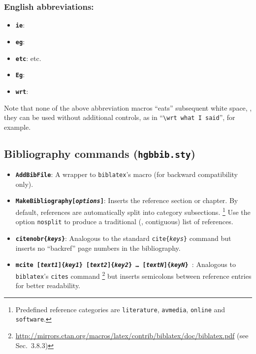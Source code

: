 \documentclass[english]{hgbarticle}
\begin{document}
\subsubsection*{English abbreviations:}

\begin{itemize}
    \item \textbf{\texttt{{\bs}ie}}: \ie
    \item \textbf{\texttt{{\bs}eg}}: \eg
    \item \textbf{\texttt{{\bs}etc}}: etc.
    \item \textbf{\texttt{{\bs}Eg}}: \Eg
    \item \textbf{\texttt{{\bs}wrt}}: \wrt
\end{itemize}

\noindent
Note that none of the above abbreviation macros ``eats'' subsequent white
space, \ie, they can be used without additional controls, as in
``\verb!\wrt what I said!'', for example.

\subsection{Bibliography commands (\texttt{hgbbib.sty})}

\begin{itemize}
    \item
    \textbf{\texttt{{\bs}AddBibFile}}: A wrapper to \texttt{biblatex}'s
    \verb!! macro (for backward compatibility only).
    \item
    \textbf{\texttt{{\bs}MakeBibliography[\emph{options}]}}: Inserts the
    reference section or chapter. By default, references are automatically
    split into category subsections.%
    \footnote{Predefined reference categories are \texttt{literature},
        \texttt{avmedia}, \texttt{online} and \texttt{software}.}
    Use the option \texttt{nosplit} to produce a traditional (\ie,
    contiguous) list of references.
    \item
    \textbf{\texttt{{\bs}citenobr\{\emph{keys}\}}}: Analogous to the standard
    \texttt{{\bs}cite\{\emph{keys}\}} command but inserts no ``backref''
    page numbers in the bibliography.
    \item
    \textbf{\texttt{{\bs}mcite%
        [\emph{text1}]\{\emph{key1}\}%
        [\emph{text2}]\{\emph{key2}\}%
        \ldots
        [\emph{textN}]\{\emph{keyN}\}%
    }}:
    Analogous to \texttt{bib\-la\-tex}'s \texttt{{\bs}cites} command%
    \footnote{%
    \url{http://mirrors.ctan.org/macros/latex/contrib/biblatex/doc/biblatex.pdf}
    (see Sec.~3.8.3)} but inserts semicolons between reference entries for
    better readability.
\end{itemize}
\end{document}
